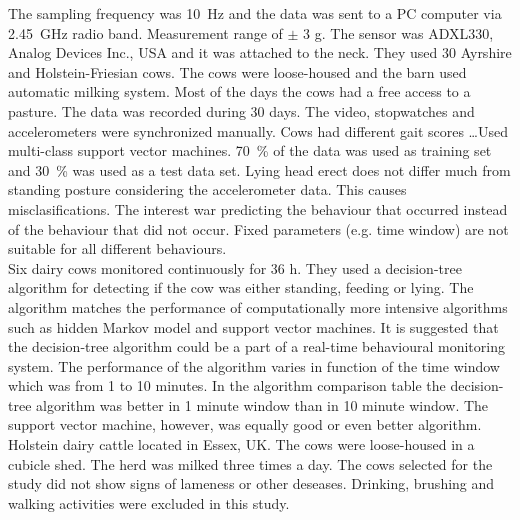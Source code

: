 \documentclass[english,12pt,a4paper,pdftex,elec,utf8]{aaltothesis}
\begin{document}
The sampling frequency was \SI{10}{\hertz} and the data was sent to a PC computer via \SI{2.45}{\giga\hertz} radio band. Measurement range of $\pm$ 3 g. The sensor was ADXL330, Analog Devices Inc., USA and it was attached to the neck. They used 30 Ayrshire and Holstein-Friesian cows. The cows were loose-housed and the barn used automatic milking system. Most of the days the cows had a free access to a pasture. The data was recorded during 30 days. The video, stopwatches and accelerometers were synchronized manually. Cows had different gait scores \dots Used multi-class support vector machines. \SI{70}{\percent} of the data was used as training set and \SI{30}{\percent} was used as a test data set. Lying head erect does not differ much from standing posture considering the accelerometer data. This causes misclasifications. The interest war predicting the behaviour that occurred instead of the behaviour that did not occur. Fixed parameters (e.g. time window) are not suitable for all different behaviours. \cite{Martiskainen200932} \\


Six dairy cows monitored continuously for 36 h. They used a decision-tree algorithm for detecting if the cow was either standing, feeding or lying. The algorithm matches the performance of computationally more intensive algorithms such as hidden Markov model and support vector machines. It is suggested that the decision-tree algorithm could be a part of a real-time behavioural monitoring system. The performance of the algorithm varies in function of the time window which was from 1 to 10 minutes. In the algorithm comparison table the decision-tree algorithm was better in 1 minute window than in 10 minute window. The support vector machine, however, was equally good or even better algorithm. Holstein dairy cattle located in Essex, UK. The cows were loose-housed in a cubicle shed. The herd was milked three times a day. The cows selected for the study did not show signs of lameness or other deseases. Drinking, brushing and walking activities were excluded in this study. \cite{VazquezDiosdado2015}
\end{document}
